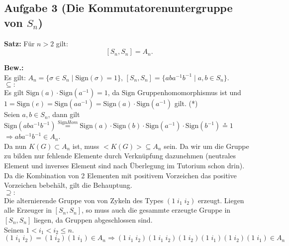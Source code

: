 \documentclass[11pt,a4paper,ngerman]{article}
\newcommand{\sign}{\text{Sign}}
\begin{document}

\subsection*{Aufgabe 3 \mdseries (Die Kommutatorenuntergruppe von $S_n$)}

\textbf{Satz:} Für $n>2$ gilt:
$$
\left[ S_n , S_n \right] = A_n.
$$

\textbf{Bew.:}\\

Es gilt:
$A_n = \{ \sigma \in S_n \; | \; \sign( \sigma ) = 1 \}$, $[S_n,S_n] = \{ aba^{-1}b^{-1} \; | \; a,b \in S_n\}$.\\

$\subseteq :$\\
Es gilt $\sign(a) \cdot \sign(a^{-1}) = 1$, da $\sign$ Gruppenhomomorphismus ist und \\
$1 = \sign(e) = \sign(a a^{-1}) = \sign(a) \cdot \sign(a^{-1})$ gilt. (*)\\

Seien $a,b \in S_n$, dann gilt\\
$\sign (aba^{-1}b^{-1}) \stackrel{\sign Hom}{=} \sign(a) \cdot \sign(b) \cdot \sign(a^{-1}) \cdot \sign(b^{-1}) \stackrel{*}{=} 1$\\
$\Rightarrow aba^{-1}b^{-1} \in A_n$.\\

Da nun $K(G) \subset A_n$ ist, muss $<K(G)> \subseteq A_n$ sein. Da wir um die Gruppe zu bilden nur fehlende Elemente durch Verknüpfung dazunehmen (neutrales Element und inverses Element sind nach Überlegung im Tutorium schon drin). Da die Kombination von 2 Elementen mit positivem Vorzeichen das positive Vorzeichen bebehält, gilt die Behauptung.\\

$\supseteq :$\\

Die alternierende Gruppe von von Zykeln des Types $(1 \; i_1 \; i_2)$ erzeugt. Liegen alle Erzeuger in $[S_n, S_n]$, so muss auch die gesammte erzeugte Gruppe in $[S_n,S_n]$ liegen, da Gruppen abgeschlossen sind.\\

Seinen $1 < i_1 < i_2 \leq n$.\\
$(1 \; i_1 \; i_2) = (1 \; i_2) (1 \; i_1) \in A_n \Rightarrow (1 \; i_1 \; i_2) (1 \; i_1 \; i_2 ) (1 \; i_2) (1 \; i_1) (1 \; i_2) (1 \; i_1) \in A_n$
\end{document}

